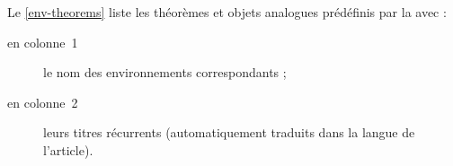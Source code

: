Le \vref{env-theorems} liste les théorèmes et objets analogues prédéfinis par la
\nwejmauthorcl{} avec :
\begin{description}
\item[en colonne~1] le nom des environnements correspondants ;
\item[en colonne~2] leurs titres récurrents (automatiquement traduits dans la
  langue de l'article).
\end{description}


